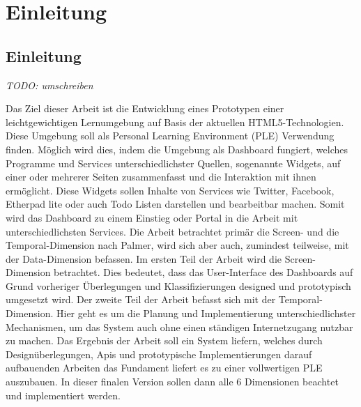 \chapter{Einleitung} 
\label{Kapitel 1}
\section{Einleitung}

\emph{TODO: umschreiben}

Das Ziel dieser Arbeit ist die Entwicklung eines Prototypen einer leichtgewichtigen Lernumgebung auf Basis der aktuellen HTML5-Technologien. Diese Umgebung soll als Personal Learning Environment (PLE) Verwendung finden. Möglich wird dies, indem die Umgebung als Dashboard fungiert, welches Programme und Services unterschiedlichster Quellen, sogenannte Widgets, auf einer oder mehrerer Seiten zusammenfasst und die Interaktion mit ihnen ermöglicht. Diese Widgets sollen Inhalte von Services wie Twitter, Facebook, Etherpad lite oder auch Todo Listen darstellen und bearbeitbar machen. Somit wird das Dashboard zu einem Einstieg oder Portal in die Arbeit mit unterschiedlichsten Services. 
Die Arbeit betrachtet primär die Screen- und die Temporal-Dimension nach Palmer, wird sich aber auch, zumindest teilweise, mit der Data-Dimension befassen. Im ersten Teil der Arbeit wird die Screen-Dimension betrachtet. Dies bedeutet, dass das User-Interface des Dashboards auf Grund vorheriger Überlegungen und Klassifizierungen designed und prototypisch umgesetzt wird. Der zweite Teil der Arbeit befasst sich mit der Temporal-Dimension. Hier geht es um die Planung und Implementierung unterschiedlichster Mechanismen, um das System auch ohne einen ständigen Internetzugang nutzbar zu machen.
Das Ergebnis der Arbeit soll ein System liefern, welches durch Designüberlegungen, Apis und prototypische Implementierungen darauf aufbauenden Arbeiten das Fundament liefert es zu einer vollwertigen PLE auszubauen. In dieser finalen Version sollen dann alle 6 Dimensionen beachtet und implementiert werden.